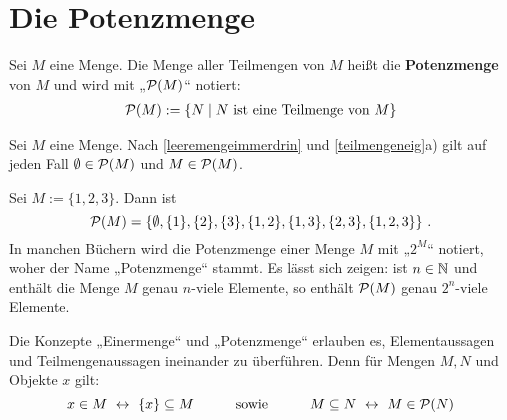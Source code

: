 \section{Die Potenzmenge}


\begin{defin}[Potenzmenge] \label{def:potenzmenge} 
    Sei $M$ eine Menge. Die Menge aller Teilmengen von $M$ heißt die \textbf{Potenzmenge} von $M$ und wird mit „$\mathcal P(M)$“ notiert:
    \begin{align*}
        \mathcal P(M) := \{N \mid N \ \text{ist eine Teilmenge von $M$} \}
    \end{align*}
\end{defin}


\begin{bem}
    Sei $M$ eine Menge. Nach \cref{leeremengeimmerdrin} und \cref{teilmengeneig}a) gilt auf jeden Fall $\emptyset\in \mathcal P(M)$ und $M\in \mathcal P(M)$.
\end{bem}


\begin{bsp} \label{bsp:potenzmenge}
    Sei $M:=\{1,2,3\}$. Dann ist
        \[ \mathcal P(M)=\left\{\emptyset,\{1\},\{2\},\{3\},\{1,2\},\{1,3\},\{2,3\},\{1,2,3\}\right\}\,. \]
    In manchen Büchern wird die Potenzmenge einer Menge $M$ mit „$2^M$“ notiert, woher der Name „Potenzmenge“ stammt. Es lässt sich zeigen: ist $n\in \mathbb N$ und enthält die Menge $M$ genau $n$-viele Elemente, so enthält $\mathcal P(M)$ genau $2^n$-viele Elemente.
\end{bsp}


\begin{bem}
    Die Konzepte „Einermenge“ und „Potenzmenge“ erlauben es, Elementaussagen und Teilmengenaussagen ineinander zu überführen. Denn für Mengen $M,N$ und Objekte $x$ gilt:
        \[ x\in M\ \leftrightarrow\ \{x\}\subseteq M \quad\qquad\text{sowie}\quad\qquad M\subseteq N\  \leftrightarrow\ M\in \calP(N) \]
\end{bem}


